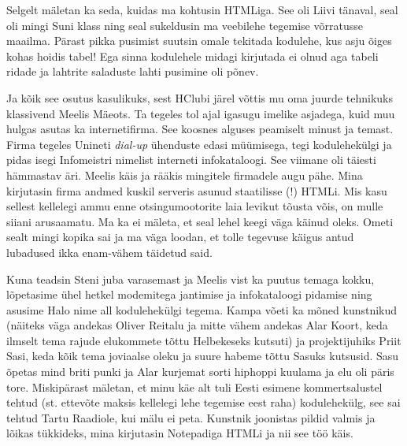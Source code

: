 Selgelt mäletan ka seda, kuidas ma kohtusin HTMLiga. See oli Liivi tänaval, seal oli mingi Suni klass ning seal sukeldusin ma veebilehe tegemise võrratusse maailma. Pärast pikka pusimist suutsin omale tekitada kodulehe, kus asju õiges kohas hoidis tabel! Ega sinna kodulehele midagi kirjutada ei olnud aga tabeli ridade ja lahtrite saladuste lahti pusimine oli põnev.

Ja kõik see osutus kasulikuks, sest HClubi järel võttis mu oma juurde tehnikuks klassivend Meelis Mäeots. Ta tegeles tol ajal igasugu imelike asjadega, kuid muu hulgas asutas ka internetifirma. See koosnes alguses peamiselt minust ja temast. Firma tegeles Unineti \emph{dial-up} ühenduste edasi müümisega, tegi kodulehekülgi ja pidas isegi Infomeistri nimelist interneti infokataloogi. See viimane oli täiesti hämmastav äri. Meelis käis ja rääkis mingitele firmadele augu pähe. Mina kirjutasin firma andmed kuskil serveris asunud staatilisse (!) HTMLi. Mis kasu sellest kellelegi ammu enne otsingumootorite laia levikut tõusta võis, on mulle siiani arusaamatu. Ma ka ei mäleta, et seal lehel keegi väga käinud oleks. Ometi sealt mingi kopika sai ja ma väga loodan, et tolle tegevuse käigus antud lubadused ikka enam-vähem täidetud said. 

Kuna teadsin Steni juba varasemast ja Meelis vist ka puutus temaga kokku, lõpetasime ühel hetkel modemitega jantimise ja infokataloogi pidamise ning asusime Halo nime all kodulehekülgi tegema. Kampa võeti ka mõned kunstnikud (näiteks väga andekas Oliver Reitalu ja mitte vähem andekas Alar Koort, keda ilmselt tema rajude elukommete tõttu Helbekeseks kutsuti) ja projektijuhiks Priit Sasi, keda kõik tema joviaalse oleku ja suure habeme tõttu Sasuks kutsusid. Sasu õpetas mind briti punki ja Alar kurjemat sorti hiphoppi kuulama ja elu oli päris tore. Miskipärast mäletan, et minu käe alt tuli Eesti esimene kommertsalustel tehtud (st. ettevõte maksis kellelegi lehe tegemise eest raha) kodulehekülg, see sai tehtud Tartu Raadiole, kui mälu ei peta. Kunstnik joonistas pildid valmis ja lõikas tükkideks, mina kirjutasin Notepadiga HTMLi ja nii see töö käis. 


